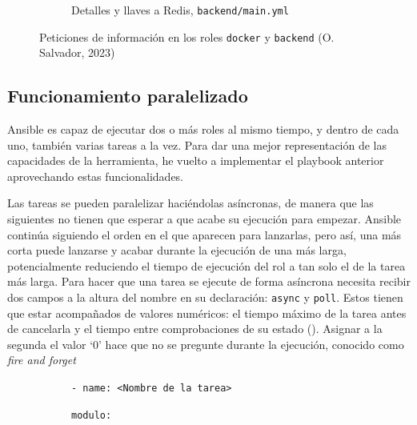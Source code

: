 \documentclass[11pt]{article}
\begin{document}
\begin{flushleft}
\begin{figure}[htb]
            \begin{subfigure}{0.85\textwidth}
                \inputminted[fontsize=\scriptsize, firstline=14, lastline=22, linenos, frame=single, breaklines]{yaml}{../../ansible/ansible/roles/backend/main.yml}
                \vspace{.5cm}
                \caption{Detalles y llaves a Redis, \texttt{backend/main.yml}}
			\end{subfigure}
            \caption{Peticiones de información en los roles \texttt{docker} y \texttt{backend} (O. Salvador, 2023)}
		\end{figure} 
  
    \subsection{Funcionamiento paralelizado}
    Ansible es capaz de ejecutar dos o más roles al mismo tiempo, y dentro de cada uno, también varias tareas a la vez. Para dar una mejor representación de las capacidades de la herramienta, he vuelto a implementar el playbook anterior aprovechando estas funcionalidades.
    \linebreak

    Las tareas se pueden paralelizar haciéndolas asíncronas, de manera que las siguientes no tienen que esperar a que acabe su ejecución para empezar. Ansible continúa siguiendo el orden en el que aparecen para lanzarlas, pero así, una más corta puede lanzarse y acabar durante la ejecución de una más larga, potencialmente reduciendo el tiempo de ejecución del rol a tan solo el de la tarea más larga. Para hacer que una tarea se ejecute de forma asíncrona necesita recibir dos campos a la altura del nombre en su declaración: \texttt{async} y  \texttt{poll}. Estos tienen que estar acompañados de valores numéricos: el tiempo máximo de la tarea antes de cancelarla y el tiempo entre comprobaciones de su estado (\cite{ansible_async}). Asignar a la segunda el valor `0' hace que no se pregunte durante la ejecución, conocido como \textit{fire and forget}
    \linebreak

        \begin{figure}[htb]
			\centering
			\begin{subfigure}{0.6\textwidth}
            \footnotesize
            \texttt{- name: <Nombre de la tarea>} 
        
            \hspace{2.2mm}
            \texttt{modulo:} 
        

\end{subfigure}
\end{figure}
\end{flushleft}
\end{document}
